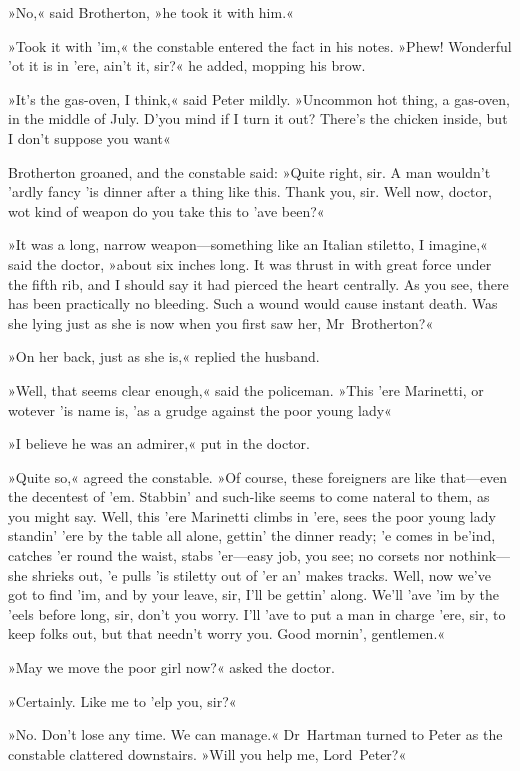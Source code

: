 »No,« said Brotherton, »he took it with him.«

»Took it with 'im,« the constable entered the fact in his notes. »Phew! Wonderful 'ot it is in 'ere, ain't it, sir?« he added, mopping his brow.

»It's the gas-oven, I think,« said Peter mildly. »Uncommon hot thing, a gas-oven, in the middle of July. D'you mind if I turn it out? There's the chicken inside, but I don't suppose you want\longdash«

Brotherton groaned, and the constable said: »Quite right, sir. A man wouldn't 'ardly fancy 'is dinner after a thing like this. Thank you, sir. Well now, doctor, wot kind of weapon do you take this to 'ave been?«

»It was a long, narrow weapon—something like an Italian stiletto, I imagine,« said the doctor, »about six inches long. It was thrust in with great force under the fifth rib, and I should say it had pierced the heart centrally. As you see, there has been practically no bleeding. Such a wound would cause instant death. Was she lying just as she is now when you first saw her, Mr~Brotherton?«

»On her back, just as she is,« replied the husband.

»Well, that seems clear enough,« said the policeman. »This 'ere Marinetti, or wotever 'is name is, 'as a grudge against the poor young lady\longdash«

»I believe he was an admirer,« put in the doctor.

»Quite so,« agreed the constable. »Of course, these foreigners are like that—even the decentest of 'em. Stabbin' and such-like seems to come nateral to them, as you might say. Well, this 'ere Marinetti climbs in 'ere, sees the poor young lady standin' 'ere by the table all alone, gettin' the dinner ready; 'e comes in be'ind, catches 'er round the waist, stabs 'er—easy job, you see; no corsets nor nothink—she shrieks out, 'e pulls 'is stiletty out of 'er an' makes tracks. Well, now we've got to find 'im, and by your leave, sir, I'll be gettin' along. We'll 'ave 'im by the 'eels before long, sir, don't you worry. I'll 'ave to put a man in charge 'ere, sir, to keep folks out, but that needn't worry you. Good mornin', gentlemen.«

»May we move the poor girl now?« asked the doctor.

»Certainly. Like me to 'elp you, sir?«

»No. Don't lose any time. We can manage.« Dr~Hartman turned to Peter as the constable clattered downstairs. »Will you help me, Lord~Peter?«

